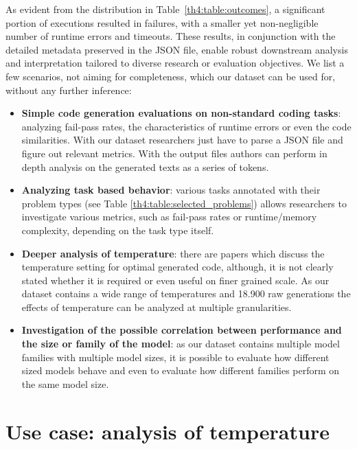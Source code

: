 As evident from the distribution in Table~\ref{th4:table:outcomes}, a significant portion of executions resulted in failures, with a smaller yet non-negligible number of runtime errors and timeouts.
These results, in conjunction with the detailed metadata preserved in the JSON file, enable robust downstream analysis and interpretation tailored to diverse research or evaluation objectives.
We list a few scenarios, not aiming for completeness, which our dataset can be used for, without any further inference:
\begin{itemize}
	\item \textbf{Simple code generation evaluations on non-standard coding tasks}: analyzing fail-pass rates, the characteristics of runtime errors or even the code similarities. With our dataset researchers just have to parse a JSON file and figure out relevant metrics. With the output files authors can perform in depth analysis on the generated texts as a series of tokens.
	
	\item \textbf{Analyzing task based behavior}: various tasks annotated with their problem types (see Table \ref{th4:table:selected_problems}) allows researchers to investigate various metrics, such as fail-pass rates or runtime/memory complexity, depending on the task type itself.
	
	\item \textbf{Deeper analysis of temperature}: there are papers \cite{temperature_optimization_2, temperature_optimization_3}which discuss the temperature setting for optimal generated code, although, it is not clearly stated whether it is required or even useful on finer grained scale. As our dataset contains a wide range of temperatures and 18.900 raw generations the effects of temperature can be analyzed at multiple granularities.
	
	\item \textbf{Investigation of the possible correlation between performance and the size or family of the model}: as our dataset contains multiple model families with multiple model sizes, it is possible to evaluate how different sized models behave and even to evaluate how different families perform on the same model size.
\end{itemize}


\section{Use case: analysis of temperature}
\label{th4:sec:use_case}

